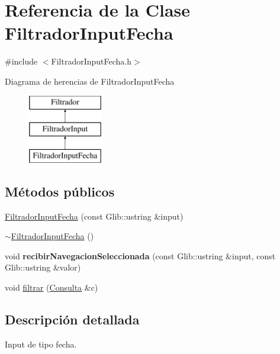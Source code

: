 \hypertarget{classFiltradorInputFecha}{\section{\-Referencia de la \-Clase \-Filtrador\-Input\-Fecha}
\label{classFiltradorInputFecha}
}


{\ttfamily \#include $<$\-Filtrador\-Input\-Fecha.\-h$>$}

\-Diagrama de herencias de \-Filtrador\-Input\-Fecha\begin{figure}[H]
\begin{center}
\leavevmode
\includegraphics[height=3.000000cm]{classFiltradorInputFecha}
\end{center}
\end{figure}
\subsection*{\-Métodos públicos}
\begin{DoxyCompactItemize}
\item 
\hyperlink{classFiltradorInputFecha_af3194e39d85744b3755361ed508daba6}{\-Filtrador\-Input\-Fecha} (const \-Glib\-::ustring \&input)
\item 
\hyperlink{classFiltradorInputFecha_a23948a5fa09756f32d3f2a66a465631d}{$\sim$\-Filtrador\-Input\-Fecha} ()
\item 
\hypertarget{classFiltradorInputFecha_afc1e623ea9571ca1ddbcdedda625ce60}{void {\bfseries recibir\-Navegacion\-Seleccionada} (const \-Glib\-::ustring \&input, const \-Glib\-::ustring \&valor)}\label{classFiltradorInputFecha_afc1e623ea9571ca1ddbcdedda625ce60}

\item 
void \hyperlink{classFiltradorInputFecha_a4ca7340057566a1247bc082ba94dad25}{filtrar} (\hyperlink{classConsulta}{\-Consulta} \&c)
\end{DoxyCompactItemize}


\subsection{\-Descripción detallada}
\-Input de tipo fecha. 

